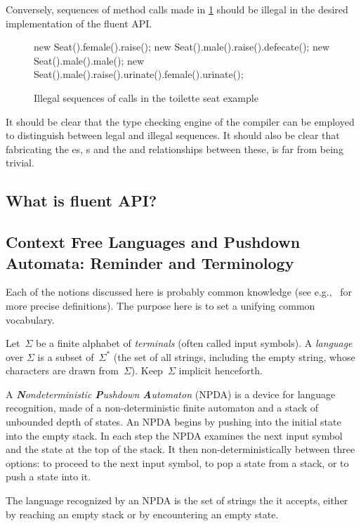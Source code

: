 Conversely, sequences of method calls made in \cref{Figure:toilette:illegal}
  should be illegal in the desired implementation of the fluent API.

\begin{figure}[htbp]
  \begin{JAVA}
new Seat().female().raise();
new Seat().male().raise().defecate();
new Seat().male().male();
new Seat().male().raise().urinate().female().urinate();\end{JAVA}
  \caption{Illegal sequences of calls in the toilette seat example}
  \label{Figure:toilette:illegal}
\end{figure}
It should be clear that the type checking engine of the compiler can
be employed to distinguish between legal and illegal sequences.
It should also be clear that fabricating the es, s
and the  and  relationships between these, is
far from being trivial.

\subsection{What is fluent API?}

\subsection{Context Free Languages and Pushdown Automata: Reminder and Terminology}
Each of the notions discussed here is probably common knowledge
 (see e.g.,~\cite{Hopcroft:book:2001,must be others} for more precise definitions).
The purpose here is to set a unifying common vocabulary. 

Let~$Σ$ be a finite alphabet of \emph{terminals} (often called input symbols).
A \emph{language} over $Σ$
  is a subset of~$Σ^*$ (the set of all strings, including the empty string,
  whose characters are drawn from~$Σ$).
Keep~$Σ$ implicit henceforth.

A \emph{\textbf Nondeterministic \textbf Pushdown \textbf Automaton} (NPDA) is a device for language recognition, 
  made of a non-deterministic finite automaton 
  and a stack of unbounded depth of states.
An NPDA begins by pushing into the initial state into the empty stack.
In each step the NPDA examines the next input symbol and the state at the
  top of the stack.
It then non-deterministically between three options: to proceed to the next input symbol,  
  to pop a state from a stack, or to push a state into it. 

The language recognized by an NPDA is the set of strings the it accepts,
  either by reaching an empty stack or by encountering an empty state. 

